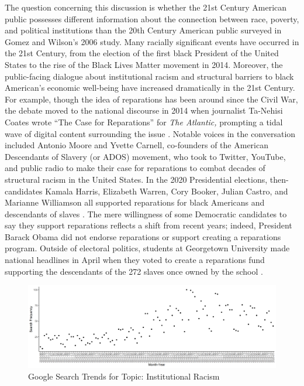 \documentclass[12pt]{paper}
\begin{document}
The question concerning this discussion is whether the 21st Century American public possesses different information about the connection between race, poverty, and political institutions than the 20th Century American public surveyed in Gomez and Wilson's 2006 study. Many racially significant events have occurred in the 21st Century, from the election of the first black President of the United States to the rise of the Black Lives Matter movement in 2014. Moreover, the public-facing dialogue about institutional racism and structural barriers to black American's economic well-being have increased dramatically in the 21st Century. For example, though the idea of reparations has been around since the Civil War, the debate moved to the national discourse in 2014 when journalist Ta-Nehisi Coates wrote “The Case for Reparations” for \textit{The Atlantic,} prompting a tidal wave of digital content surrounding the issue \citep{coates_case_2014}. Notable voices in the conversation included Antonio Moore and Yvette Carnell, co-founders of the American Descendants of Slavery (or ADOS) movement, who took to Twitter, YouTube, and public radio to make their case for reparations to combat decades of structural racism in the United States. In the 2020 Presidential elections, then-candidates Kamala Harris, Elizabeth Warren, Cory Booker, Julian Castro, and Marianne Williamson all supported reparations for black Americans and descendants of slaves \citep{lockhart_2020_2019}. The mere willingness of some Democratic candidates to say they support reparations reflects a shift from recent years; indeed, President Barack Obama did not endorse reparations or support creating a reparations program. Outside of electoral politics, students at Georgetown University made national headlines in April when they voted to create a reparations fund supporting the descendants of the 272 slaves once owned by the school \citep{hassan_georgetown_2019}.

\begin{figure}[h!]
	\includegraphics[scale=.55]{fig/google-trends.png}
	\caption{Google Search Trends for Topic: Institutional Racism}
	\label{trends}
\end{figure}
\end{document}
